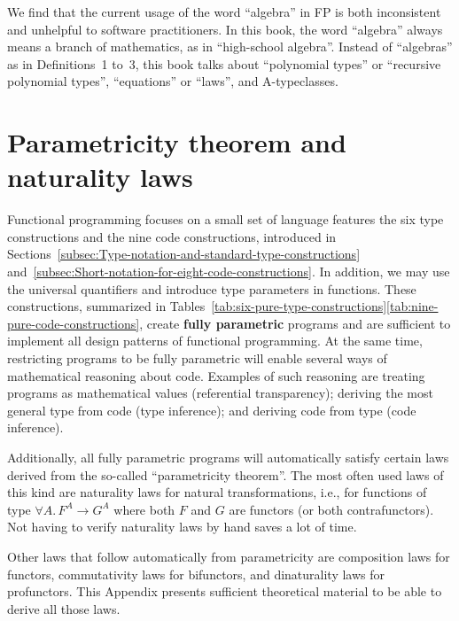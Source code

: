 We find that the current usage of the word \textsf{``}algebra\textsf{''} in FP is
both inconsistent and unhelpful to software practitioners. In this
book, the word \textsf{``}algebra\textsf{''} always means a branch of mathematics,
as in \textsf{``}high-school algebra\textsf{''}. Instead of \textsf{``}algebras\textsf{''} as in Definitions~1
to~3, this book talks about \textsf{``}polynomial types\textsf{''} or \textsf{``}recursive
polynomial types\textsf{''}, \textsf{``}equations\textsf{''} or \textsf{``}laws\textsf{''}, and A-typeclasses.

\chapter{Parametricity theorem and naturality laws\label{app:Proofs-of-naturality-parametricity}}

Functional programming focuses on a small set of language features
\textemdash{} the six type constructions and the nine code constructions,
introduced in Sections~\ref{subsec:Type-notation-and-standard-type-constructions}
and~\ref{subsec:Short-notation-for-eight-code-constructions}. In
addition, we may use the universal quantifiers and introduce type
parameters in functions. These constructions, summarized in Tables~\ref{tab:six-pure-type-constructions}\textendash \ref{tab:nine-pure-code-constructions},
create \textbf{fully parametric} programs
and are sufficient to implement all design patterns of functional
programming. At the same time, restricting programs to be fully parametric
will enable several ways of mathematical reasoning about code. Examples
of such reasoning are treating programs as mathematical values (referential
transparency); deriving the most
general type from code (type inference); and
deriving code from type (code inference).

Additionally, all fully parametric programs will automatically satisfy
certain laws derived from the so-called \textsf{``}parametricity theorem\textsf{''}.
The most often used laws of this kind are naturality laws for natural
transformations, i.e., for functions of type $\forall A.\,F^{A}\rightarrow G^{A}$
where both $F$ and $G$ are functors (or both contrafunctors). Not
having to verify naturality laws by hand saves a lot of time.

Other laws that follow automatically from parametricity are composition
laws for functors, commutativity laws for bifunctors, and dinaturality
laws for profunctors. This Appendix presents sufficient theoretical
material to be able to derive all those laws. 

